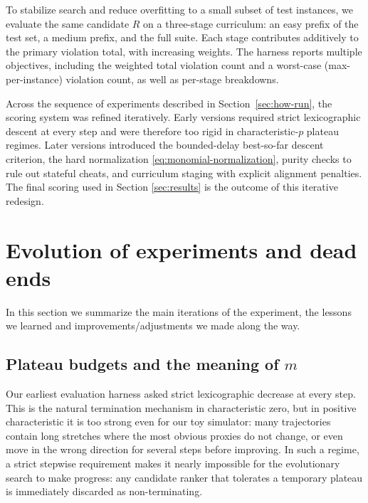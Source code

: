 \documentclass[11pt]{amsart}
\begin{document}
To stabilize search and reduce overfitting to a small subset of test instances, we evaluate the same candidate $R$
on a three-stage curriculum: an easy prefix of the test set, a medium prefix, and the full suite.
Each stage contributes additively to the primary violation total, with increasing weights.
The harness reports multiple objectives, including the weighted total violation count and a worst-case (max-per-instance) violation count,
as well as per-stage breakdowns.

Across the sequence of experiments described in Section~\ref{sec:how-run}, the scoring system was refined iteratively.
Early versions required strict lexicographic descent at every step and were therefore too rigid in characteristic-$p$ plateau regimes.
Later versions introduced the bounded-delay best-so-far descent criterion, the hard normalization \eqref{eq:monomial-normalization},
purity checks to rule out stateful cheats, and curriculum staging with explicit alignment penalties.
The final scoring used in Section \ref{sec:results} is the outcome of this iterative redesign.

\section{Evolution of experiments and dead ends}\label{section:experimentI}

In this section we summarize the main iterations of the experiment, the lessons we learned and improvements/adjustments we made along the way.

\subsection{Plateau budgets and the meaning of $m$}
Our earliest evaluation harness asked strict lexicographic decrease at every step.
This is the natural termination mechanism in characteristic zero, but in positive characteristic
it is too strong even for our toy simulator: many trajectories contain long stretches where the most
obvious proxies do not change, or even move in the
wrong direction for several steps before improving.
In such a regime, a strict stepwise requirement makes it nearly impossible for the evolutionary
search to make progress: any candidate ranker that tolerates a temporary plateau is immediately
discarded as non-terminating.
\end{document}
